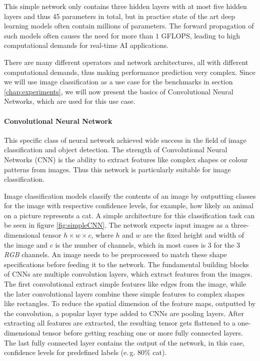 This simple network only contains three hidden layers with at most five hidden layers and thus 45 parameters in total, but in practice state of the art deep learning models often contain millions of parameters. 
The forward propagation of such models often causes the need for more than $1$ GFLOPS, leading to high computational demands for real-time AI applications.


There are many different operators and network architectures, all with different computational demands, thus making performance prediction very complex.
Since we will use image classification as a use case for the benchmarks in section \ref{chap:experiments}, we will now present the basics of Convolutional Neural Networks, which are used for this use case.

\paragraph{Convolutional Neural Network}
This specific class of neural network achieved wide success in the field of image classification and object detection.
The strength of Convolutional Neural Networks (CNN) is the ability to extract features like complex shapes or colour patterns from images. Thus this network is particularly suitable for image classification.

Image classification models classify the contents of an image by outputting classes for the image with respective confidence levels, for example, how likely an animal on a picture represents a cat.
A simple architecture for this classification task can be seen in figure \ref{fig:simpleCNN}.
The network expects input images as a three-dimensional tensor $h\times w\times c$, where $h$ and $w$ are the fixed height and width of the image and $c$ is the number of channels, which in most cases is $3$ for the $3$ \emph{RGB} channels.
An image needs to be preprocessed to match these shape specifications before feeding it to the network.
The fundamental building blocks of CNNs are multiple convolution layers, which extract features from the images. The first convolutional extract simple features like edges from the image, while the later convolutional layers combine these simple features to complex shapes like rectangles.
To reduce the spatial dimension of the feature maps, outputted by the convolution, a popular layer type added to CNNs are pooling layers.
After extracting all features are extracted, the resulting tensor gets flattened to a one-dimensional tensor before getting reaching one or more fully connected layers.
The last fully connected layer contains the output of the network, in this case, confidence levels for predefined labels (e.\,g. $80$\% cat).  



